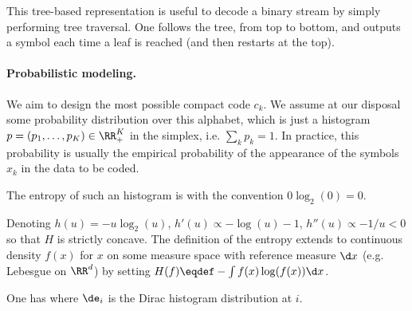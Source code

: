
This tree-based representation is useful to decode a binary stream by simply performing tree traversal. One follows the tree, from top to bottom, and outputs a symbol each time a leaf is reached (and then restarts at the top). 


\paragraph{Probabilistic modeling.}

We aim to design the most possible compact code $c_k$. 
%
We assume at our disposal some probability distribution over this alphabet, which is just a histogram $p=(p_1,\ldots,p_K) \in \RR_+^K$ in the simplex, i.e. $\sum_k p_k=1$. 
%
In practice, this probability is usually the empirical probability of the appearance of the symbols $x_k$ in the data to be coded. 


The entropy of such an histogram is 
with the convention $0\log_2(0)=0$. 

Denoting $h(u)=-u \log_2(u)$, $h'(u) \propto -\log(u)-1$, $h''(u) \propto -1/u<0$ so that $H$ is strictly concave. The definition of the entropy extends to continuous density $f(x)$ for $x$ on some measure space with reference measure $\d x$ (e.g. Lebesgue on $\RR^d$) by setting $H(f) \eqdef -\int f(x) \log(f(x)) \d x$. 






\begin{lem} One has
where $\de_i$ is the Dirac histogram distribution at $i$. 
\end{lem}


